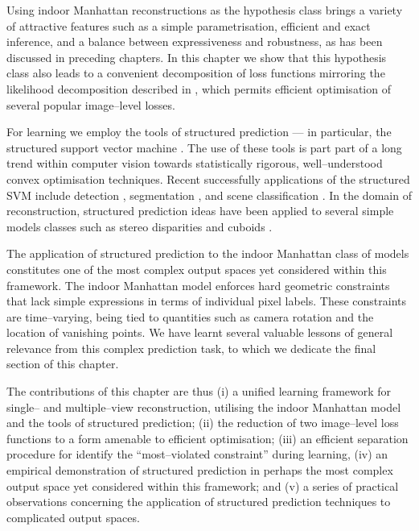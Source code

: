 Using indoor Manhattan reconstructions as the hypothesis class brings
a variety of attractive features such as a simple parametrisation,
efficient and exact inference, and a balance between expressiveness
and robustness, as has been discussed in preceding chapters. In this
chapter we show that this hypothesis class also leads to a convenient
decomposition of loss functions mirroring the likelihood decomposition
described in , which permits efficient optimisation of
several popular image--level losses.

For learning we employ the tools of structured prediction --- in
particular, the structured support vector machine
\cite{Tsochantaridis04}. The use of these tools is part part of a long
trend within computer vision towards statistically rigorous,
well--understood convex optimisation techniques. Recent successfully
applications of the structured SVM include detection
\cite{blaschko2008learning}, segmentation \cite{taskar2004max}, and
scene classification \cite{Yang2010}. In the domain of reconstruction,
structured prediction ideas have been applied to several simple models
classes such as stereo disparities \cite{li2008learning} and cuboids
\cite{Hedau09}.

The application of structured prediction to the indoor Manhattan class
of models constitutes one of the most complex output spaces yet
considered within this framework. The indoor Manhattan model enforces
hard geometric constraints that lack simple expressions in terms of
individual pixel labels. These constraints are time--varying,
being tied to quantities such as camera rotation and the location of
vanishing points. We have learnt several valuable lessons of general
relevance from this complex prediction task, to which we dedicate the
final section of this chapter.

The contributions of this chapter are thus (i) a unified learning
framework for single-- and multiple--view reconstruction, utilising
the indoor Manhattan model and the tools of structured prediction;
(ii) the reduction of two image--level loss functions to a form
amenable to efficient optimisation; (iii) an efficient separation
procedure for identify the ``most--violated constraint'' during
learning, (iv) an empirical demonstration of structured prediction in
perhaps the most complex output space yet considered within this
framework; and (v) a series of practical observations concerning the
application of structured prediction techniques to complicated output
spaces.

